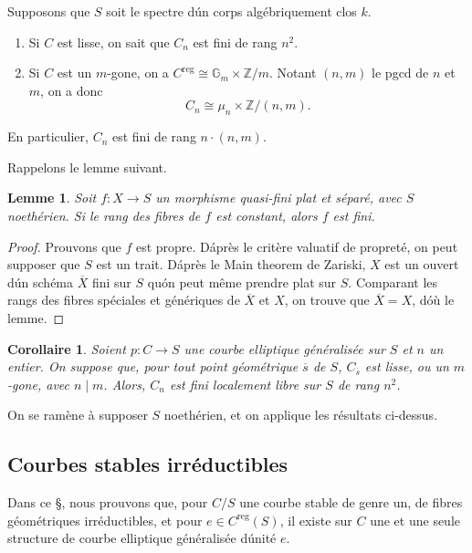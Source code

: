\documentclass{amsart}
\theoremstyle{plain}
\newtheorem{lemma}[theorem]{Lemme}
\newtheorem{corollary}[theorem]{Corollaire}
\theoremstyle{remark}
\newcommand{\bbG}{\mathbb{G}}
\newcommand{\bbZ}{\mathbb{Z}}
\begin{document}
Supposons que $S$ soit le spectre d\'un corps alg\'ebriquement clos $k$.
\begin{enumerate}
\item[(a)] Si $C$ est lisse, on sait que $C_n$ est fini de rang $n^2$.
\item[(b)] Si $C$ est un $m$-gone, on a $C^{\mathrm{reg}} \cong \bbG_m \times \bbZ/m$.
Notant $(n,m)$ le pgcd de $n$ et $m$, on a donc
\[
C_n \cong \mu_n \times \bbZ/(n,m).
\]
\end{enumerate}
En particulier, $C_n$ est fini de rang $n \cdot (n,m)$.

Rappelons le lemme suivant.

\begin{lemma}
Soit $f: X \to S$ un morphisme quasi-fini plat et s\'epar\'e, avec $S$ noeth\'erien.
Si le rang des fibres de $f$ est constant, alors $f$ est fini.
\end{lemma}

\begin{proof}
Prouvons que $f$ est propre. D\'apr\`es le crit\`ere valuatif de propret\'e, on peut
supposer que $S$ est un trait. D\'apr\`es le Main theorem de Zariski, $X$ est un ouvert
d\'un sch\'ema $\overline{X}$ fini sur $S$ qu\'on peut m\^eme prendre plat sur $S$.
Comparant les rangs des fibres sp\'eciales et g\'en\'eriques de $\overline{X}$ et $X$, on
trouve que $\overline{X} = X$, d\'o\`u le lemme.
\end{proof}

\begin{corollary}
Soient $p: C \to S$ une courbe elliptique g\'en\'eralis\'ee sur $S$ et $n$ un entier.
On suppose que, pour tout point g\'eom\'etrique $\overline{s}$ de $S$, $C_{\overline{s}}$ est
lisse, ou un $m$-gone, avec $n \mid m$. Alors, $C_n$ est fini localement libre sur $S$
de rang $n^2$.
\end{corollary}

On se ram\`ene \`a supposer $S$ noeth\'erien, et on applique les r\'esultats ci-dessus.

\subsection{Courbes stables irr\'eductibles}

Dans ce \S, nous prouvons que, pour $C/S$ une courbe stable de genre un, de fibres
g\'eom\'etriques irr\'eductibles, et pour $e \in C^{\mathrm{reg}}(S)$, il existe sur $C$ une et
une seule structure de courbe elliptique g\'en\'eralis\'ee d\'unit\'e $e$.
\end{document}
